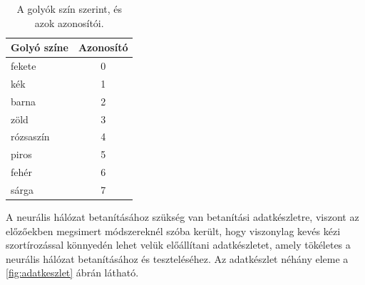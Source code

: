 \begin{table}[!ht]
    \caption{A golyók szín szerint, és azok azonosítói.}
    \label{tab:golyo_azonositok}
	\footnotesize
	\centering
	\begin{tabular}{ l c }
		\toprule
		Golyó színe & Azonosító \\
		\midrule
		fekete      & 0\\
        kék         & 1\\
        barna       & 2\\
        zöld        & 3\\
        rózsaszín   & 4\\
        piros       & 5\\
        fehér       & 6\\
        sárga       & 7\\
		\bottomrule
	\end{tabular}
\end{table}

\par A neurális hálózat betanításához szükség van betanítási adatkészletre, viszont az előzőekben megsimert módszereknél szóba került, hogy viszonylag kevés kézi szortírozással könnyedén lehet velük előállítani adatkészletet, amely tökéletes a neurális hálózat betanításához és teszteléséhez. Az adatkészlet néhány eleme a \ref{fig:adatkeszlet} ábrán látható.

